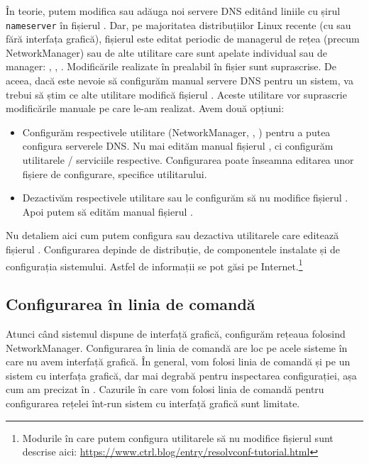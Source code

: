 În teorie, putem modifica sau adăuga noi servere DNS editând liniile cu șirul \texttt{nameserver} în fișierul .
Dar, pe majoritatea distribuțiilor Linux recente (cu sau fără interfața grafică), fișierul  este editat periodic de managerul de rețea (precum NetworkManager) sau de alte utilitare care sunt apelate individual sau de manager: , , .
Modificările realizate în prealabil în fișier sunt suprascrise.
De aceea, dacă este nevoie să configurăm manual servere DNS pentru un sistem, va trebui să știm ce alte utilitare modifică fișierul .
Aceste utilitare vor suprascrie modificările manuale pe care le-am realizat.
Avem două opțiuni:
\begin{itemize}
  \item Configurăm respectivele utilitare (NetworkManager, , ) pentru a putea configura serverele DNS.
    Nu mai edităm manual fișierul , ci configurăm utilitarele / serviciile respective.
    Configurarea poate înseamna editarea unor fișiere de configurare, specifice utilitarului.
  \item Dezactivăm respectivele utilitare sau le configurăm să nu modifice fișierul .
    Apoi putem să edităm manual fișierul .
\end{itemize}

Nu detaliem aici cum putem configura sau dezactiva utilitarele care editează fișierul .
Configurarea depinde de distribuție, de componentele instalate și de configurația sistemului.
Astfel de informații se pot găsi pe Internet.\footnote{Modurile în care putem configura utilitarele să nu modifice fișierul  sunt descrise aici: \url{https://www.ctrl.blog/entry/resolvconf-tutorial.html}}

\subsection{Configurarea în linia de comandă}
\label{sec:net:linux-config:cli}

Atunci când sistemul dispune de interfață grafică, configurăm rețeaua folosind NetworkManager.
Configurarea în linia de comandă are loc pe acele sisteme în care nu avem interfață grafică.
În general, vom folosi linia de comandă și pe un sistem cu interfața grafică, dar mai degrabă pentru inspectarea configurației, așa cum am precizat în .
Cazurile în care vom folosi linia de comandă pentru configurarea rețelei înt-run sistem cu interfață grafică sunt limitate.

